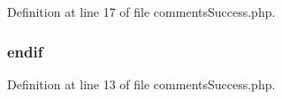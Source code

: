 Definition at line 17 of file comments\-Success.\-php.

\hypertarget{comments_success_8php_a82cd33ca97ff99f2fcc5e9c81d65251b}{
\subsubsection[{endif}]{\setlength{\rightskip}{0pt plus 5cm}endif}}\label{comments_success_8php_a82cd33ca97ff99f2fcc5e9c81d65251b}


Definition at line 13 of file comments\-Success.\-php.

